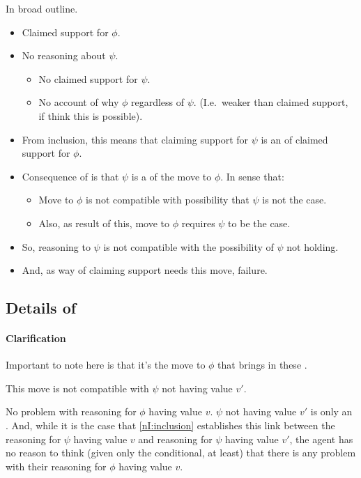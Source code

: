\begin{note}
  In broad outline.
  \begin{itemize}
  \item Claimed support for \(\phi\).
  \item No reasoning about \(\psi\).
    \begin{itemize}
    \item No claimed support for \(\psi\).
    \item No account of why \(\phi\) regardless of \(\psi\). (I.e.\ weaker than claimed support, if think this is possible).
    \end{itemize}
  \item From inclusion, this means that claiming support for \(\psi\) is an \requ{} of claimed support for \(\phi\).
  \item Consequence of \requ{} is that \(\psi\) is a \requ{} of the move to \(\phi\).
    In sense that:
    \begin{itemize}
    \item Move to \(\phi\) is not compatible with possibility that \(\psi\) is not the case.
    \item Also, as result of this, move to \(\phi\) requires \(\psi\) to be the case.
    \end{itemize}
  \item So, reasoning to \(\psi\) is not compatible with the possibility of \(\psi\) not holding.
  \item And, as way of claiming support needs this move, failure.
  \end{itemize}
\end{note}

\subsection{Details of \LCS{}}
\label{sec:details-of-lcs}

\paragraph{Clarification}

\begin{note}
  Important to note here is that it's the move to \(\phi\) that brings in these \requ{}.

  This move is not compatible with \(\psi\) not having value \(v'\).
\end{note}

\begin{note}
  No problem with reasoning for \(\phi\) having value \(v\).
  \(\psi\) not having value \(v'\) is only an \ep{}.
  And, while it is the case that \ref{nI:inclusion} establishes this link between the reasoning for \(\psi\) having value \(v\) and reasoning for \(\psi\) having value \(v'\), the agent has no reason to think (given only the conditional, at least) that there is any problem with their reasoning for \(\phi\) having value \(v\).
\end{note}

